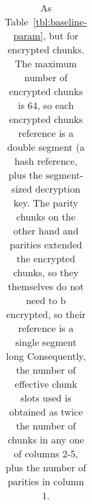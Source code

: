 \hypertarget{tbl:baseline-param-encrypted}{}
\begin{longtable}[]{@{}
  >{\raggedleft\arraybackslash}p{}
  >{\raggedleft\arraybackslash}p{}
  >{\raggedleft\arraybackslash}p{}
  >{\raggedleft\arraybackslash}p{}
  >{\raggedleft\arraybackslash}p{}@{}}
\caption{\label{tbl:baseline-param-encrypted}As
Table~\ref{tbl:baseline-param}, but for encrypted chunks. The maximum
number of encrypted chunks is 64, so each encrypted chunks reference is a double segment (a hash reference, plus the segment-sized decryption key.  The parity chunks on the other hand and parities extended the encrypted chunks, so they themselves do not need to b encrypted, so their reference is a single segment long
Consequently, the number of effective chunk slots used is obtained as
twice the number of chunks in any one of columns 2-5, plus the number of
parities in column 1.}\tabularnewline

\end{longtable}
